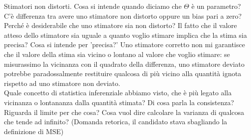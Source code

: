 \documentclass{article}
\begin{document}
    Stimatori non distorti. Cosa si intende quando diciamo che $ \Theta $ è un parametro? C'è differenza tra avere uno stimatore non distorto oppure un bias pari a zero? \\
    
    Perché è desiderabile che uno stimatore sia non distorto? Il fatto che il valore atteso dello stimatore sia uguale a quanto voglio stimare implica che la stima sia precisa?
    Cosa si intende per 'precisa?' Uno stimatore corretto non mi garantisce che il valore della stima sia vicino o lontano al valore che voglio stimare: se misurassimo la
    vicinanza con il quadrato della differenza, uno stimatore deviato potrebbe paradossalmente restituire qualcosa di più vicino alla quantità ignota rispetto ad uno stimatore
    non deviato. \\
    Quale concetto di statistica inferenziale abbiamo visto, che è più legato alla vicinanza o lontananza dalla quantità stimata? Di cosa parla la consistenza? Riguarda il
    limite per che cosa? Cosa vuol dire calcolare la varianza di qualcosa che tende ad infinito? (Domanda retorica, il candidato stava sbagliando la definizione di MSE)
    
\end{document}
